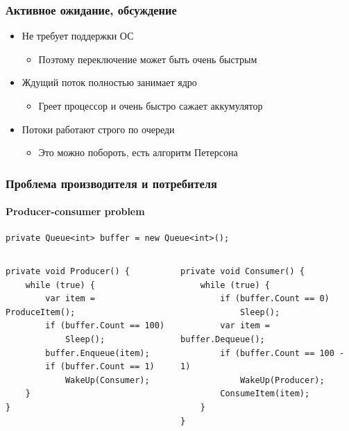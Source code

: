 \documentclass[xetex,mathserif,serif]{beamer}
\begin{document}
	\begin{frame}
		\frametitle{Активное ожидание, обсуждение}
		\begin{itemize}
			\item Не требует поддержки ОС
			\begin{itemize}
				\item Поэтому переключение может быть очень быстрым
			\end{itemize}
			\item Ждущий поток полностью занимает ядро
			\begin{itemize}
				\item Греет процессор и очень быстро сажает аккумулятор
			\end{itemize}
			\item Потоки работают строго по очереди
			\begin{itemize}
				\item Это можно побороть, есть алгоритм Петерсона
			\end{itemize}
		\end{itemize}
	\end{frame}

	\begin{frame}[fragile]
		\frametitle{Проблема производителя и потребителя}
		\framesubtitle{Producer-consumer problem}
		\begin{footnotesize}
			\begin{verbatim}
private Queue<int> buffer = new Queue<int>();
			\end{verbatim}
			\begin{columns}
				\begin{column}{0.5\textwidth}
					\begin{verbatim}
private void Producer() {
    while (true) {
        var item = ProduceItem();
        if (buffer.Count == 100)
            Sleep();
        buffer.Enqueue(item);
        if (buffer.Count == 1)
            WakeUp(Consumer);
    }
}
					\end{verbatim}
				\end{column}
				\begin{column}{0.5\textwidth}
					\begin{verbatim}
private void Consumer() {
    while (true) {
        if (buffer.Count == 0)
            Sleep();
        var item = buffer.Dequeue();
        if (buffer.Count == 100 - 1)
            WakeUp(Producer);
        ConsumeItem(item);
    }
}
					\end{verbatim}
				\end{column}
			\end{columns}
		\end{footnotesize}
	\end{frame}
\end{document}
